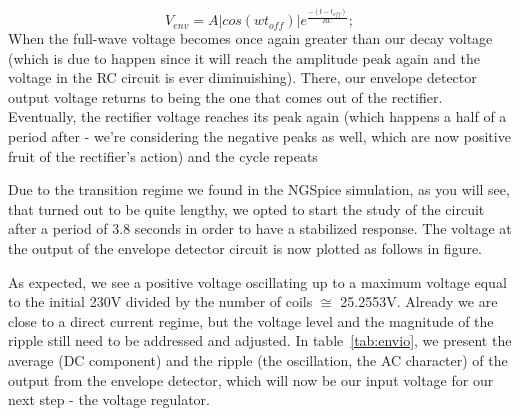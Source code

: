 \begin{equation}
V_{env} = A|cos(wt_{off})|e^\frac{-(t-t_{off})}{RC};
\end{equation}
When the full-wave voltage becomes once again greater than our decay voltage (which is due to happen since it will reach the amplitude peak again and the voltage in the RC circuit is ever diminuishing). There, our envelope detector output voltage returns to being the one that comes out of the rectifier. Eventually, the rectifier voltage reaches its peak again (which happens a half of a period after - we're considering the negative peaks as well, which are now positive fruit of the rectifier's action) and the cycle repeats

Due to the transition regime we found in the NGSpice simulation, as you will see, that turned out to be quite lengthy, we opted to start the study of the circuit after a period of 3.8 seconds in order to have a stabilized response.
The voltage at the output of the envelope detector circuit is now plotted as follows in figure.

As expected, we see a positive voltage oscillating up to a maximum voltage equal to the initial 230V divided by the number of coils $\cong$ 25.2553V. Already we are close to a direct current regime, but the voltage level and the magnitude of the ripple still need to be addressed and adjusted. In table~\ref{tab:envio}, we present the average (DC component) and the ripple (the oscillation, the AC character) of the output from the envelope detector, which will now be our input voltage for our next step - the voltage regulator.

